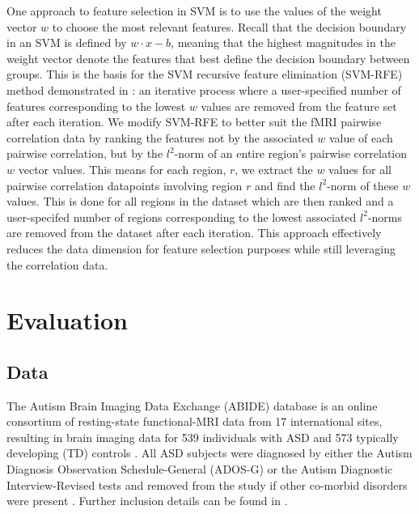 \documentclass{llncs}
\begin{document}
One approach to feature selection in SVM is to use the values of the weight
vector $w$ to choose the most relevant features.  Recall that the decision
boundary in an SVM is defined by $w \cdot x - b$, meaning that the highest
magnitudes in the weight vector denote the features that best define the
decision boundary between groups. This is the basis for the SVM recursive
feature elimination (SVM-RFE) method demonstrated in
\cite{guyon2002gene,abide,ecker2010}: an iterative process where a
user-specified number of features corresponding to the lowest $w$ values are
removed from the feature set after each iteration. We modify SVM-RFE to better
suit the fMRI pairwise correlation data by ranking the features not by the
associated $w$ value of each pairwise correlation, but by the $l^2$-norm of an
entire region's pairwise correlation $w$ vector values. This means for each
region, $r$, we extract the $w$ values for all pairwise correlation datapoints
involving region $r$ and find the $l^2$-norm of these $w$ values. This is done
for all regions in the dataset which are then ranked and a user-specifed number
of regions corresponding to the lowest associated $l^2$-norms are removed from
the dataset after each iteration.  This approach effectively reduces the data
dimension for feature selection purposes while still leveraging the correlation
data.

\section{Evaluation}
\subsection{Data}
The Autism Brain Imaging Data Exchange (ABIDE) database is an online consortium
of resting-state functional-MRI data from 17 international sites, resulting in
brain imaging data for 539 individuals with ASD and 573 typically developing
(TD) controls \cite{abide}. All ASD subjects were diagnosed by either the Autism
Diagnosis Observation Schedule-General (ADOS-G) or the Autism Diagnostic
Interview-Revised tests and removed from the study if other co-morbid disorders
were present  \cite{abide,lordADOS,lordADIR}.  Further inclusion
details can be found in \cite{abide}.
\end{document}
